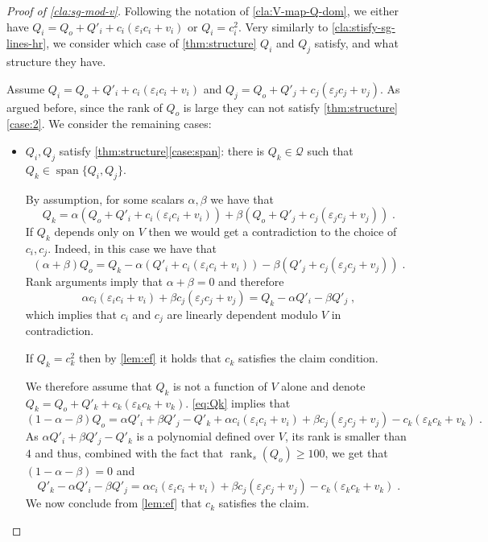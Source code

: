 \documentclass[10pt,a4paper]{article}
\def\rank{\operatorname{rank}}
\newcommand{\cQ}{{\mathcal{Q}}}
\newcommand{\spn}[1]{\operatorname{span}\{{#1}\}}
\def\epsilon{\varepsilon}
\newcommand{\rkq}{100}
\begin{document}
\begin{proof}[Proof of \autoref{cla:sg-mod-v}] 

Following the notation of \autoref{cla:V-map-Q-dom}, we either have $Q_i = Q_o + Q'_i +  c_i(\epsilon_i c_i + v_i )$ or   $Q_i = c_i^2$. Very similarly to \autoref{cla:stisfy-sg-lines-hr}, we  consider which case of \autoref{thm:structure}  $Q_i$ and $Q_j$  satisfy, and what structure they have.

Assume  $Q_i = Q_o + Q'_i +  c_i(\epsilon_i c_i + v_i )$ and  $Q_j = Q_o + Q'_j +  c_j(\epsilon_jc_j + v_j )$. As argued before, since the rank of $Q_o$ is large  they can not satisfy
 \autoref{thm:structure}\ref{case:2}. We consider the remaining cases:
\begin{itemize}
\item $Q_i,Q_j$ satisfy \autoref{thm:structure}\ref{case:span}: there is $Q_k \in \cQ$ such that $Q_k \in \spn{Q_i,Q_j}$. 

By assumption, for some scalars $\alpha,\beta$ we have that 
\begin{equation}\label{eq:Qk}
Q_k  = \alpha(Q_o + Q'_i +  c_i(\epsilon_i c_i + v_i )) + \beta(Q_o + Q'_j +  c_j(\epsilon_j c_j + v_j)) \;.  
\end{equation}
If $Q_k$ depends only on $V$ then we would get a contradiction to the choice of $c_i,c_j$. Indeed, in this case we have that
$$(\alpha+\beta)Q_o = Q_k - \alpha( Q'_i +  c_i(\epsilon_i c_i + v_i )) - \beta( Q'_j +  c_j(\epsilon_j c_j + v_j))\;.$$
Rank arguments imply that $\alpha+\beta=0$ and therefore 
$$\alpha c_i(\epsilon_i c_i + v_i ) + \beta c_j(\epsilon_j c_j + v_j) = Q_k - \alpha Q'_i - \beta Q'_j \;,$$
which implies that $c_i$ and $c_j$ are linearly dependent modulo $V$ in contradiction. 

If $Q_k = c_k^2$ then by \autoref{lem:ef} it holds that $c_k$ satisfies the claim condition.

We therefore assume that $Q_k$ is not a function of $V$ alone and denote $Q_k = Q_o + Q'_k +  c_k(\epsilon_k c_k + v_k)$.
\autoref{eq:Qk} implies that $$(1 - \alpha-\beta)Q_o = \alpha Q'_i + \beta Q'_j - Q'_k + \alpha c_i(\epsilon_i c_i + v_i ) + \beta c_j(\epsilon_j c_j + v_j) - c_k(\epsilon_k c_k + v_k)\;.$$ As $\alpha Q'_i + \beta Q'_j - Q'_k$ is a polynomial defined over $V$, its rank is smaller than $4$ and thus, combined with the fact that $\rank_s(Q_o) \geq \rkq$, we get that $ (1 - \alpha-\beta) = 0$ and 
\[Q'_k -\alpha Q'_i - \beta Q'_j = \alpha c_i(\epsilon_i c_i + v_i ) + \beta c_j(\epsilon_j c_j + v_j) - c_k(\epsilon_k c_k + v_k) \;.\]
We now conclude from \autoref{lem:ef} that $c_k$ satisfies the claim. 


\end{itemize}
\end{proof}
\end{document}
